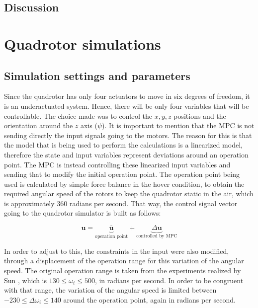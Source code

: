 \subsection{Discussion}


\section{Quadrotor simulations}

\subsection{Simulation settings and parameters}

Since the quadrotor has only four actuators to move in six degrees of freedom, it is an underactuated system. Hence, there will be only four variables that will be controllable. The choice made was to control the $x, y, z$ positions and the orientation around the $z$ axis ($\psi$). It is important to mention that the MPC is not sending directly the input signals going to the motors. The reason for this is that the model that is being used to perform the calculations is a linearized model, therefore the state and input variables represent deviations around an operation point. The MPC is instead controlling these linearized input variables and sending that to modify the initial operation point. The operation point being used is calculated by simple force balance in the hover condition, to obtain the required angular speed of the rotors to keep the quadrotor static in the air, which is approximately $360$ radians per second. That way, the control signal vector going to the quadrotor simulator is built as follows:

\begin{equation*}
\mathbf{u} = \underbrace{\mathbf{\bar{u}}}_\textrm{operation point} + \underbrace{\Delta \mathbf{u}}_\textrm{controlled by MPC}
\end{equation*}

In order to adjust to this, the constraints in the input were also modified, through a displacement of the operation range for this variation of the angular speed. The original operation range is taken from the experiments realized by Sun \cite{YueSun2012}, which is $130 \leq \omega_{i} \leq 500$, in radians per second. In order to be congruent with that range, the variation of the angular speed is limited between $-230 \leq \Delta \omega_{i} \leq 140$ around the operation point, again in radians per second.\\ 

